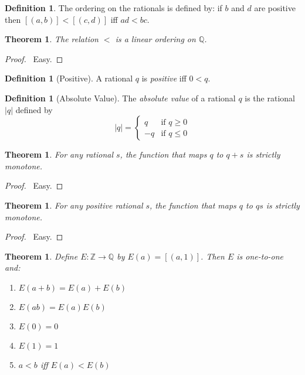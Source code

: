 \documentclass{article}
\let\qed\relax
\newtheorem{theorem}[axiom]{Theorem}
\theoremstyle{definition}
\newtheorem{definition}[axiom]{Definition}
\begin{document}
    \begin{definition}
        The ordering on the rationals is defined by: if $b$ and $d$ are positive then
        $[(a,b)] < [(c,d)]$ iff $ad < bc$.
    \end{definition}

    \begin{theorem}
        The relation $<$ is a linear ordering on $\mathbb{Q}$.
    \end{theorem}

    \begin{proof}
        \pf\ Easy. \qed
    \end{proof}

    \begin{definition}[Positive]
        A rational $q$ is \emph{positive} iff $0 < q$.
    \end{definition}

    \begin{definition}[Absolute Value]
        The \emph{absolute value} of a rational $q$ is the rational $|q|$ defined by
        \[ |q| = \begin{cases}
            q & \text{if } q \geq 0 \\
            -q & \text{if } q \leq 0
        \end{cases} \]
    \end{definition}

    \begin{theorem}
        For any rational $s$, the function that maps $q$ to $q + s$ is strictly monotone.
    \end{theorem}
    
    \begin{proof}
        \pf\ Easy. \qed
    \end{proof}

    \begin{theorem}
        For any positive rational $s$, the function that maps $q$ to $qs$ is strictly monotone.
    \end{theorem}

    \begin{proof}
        \pf\ Easy. \qed
    \end{proof}

    \begin{theorem}
        Define $E : \mathbb{Z} \rightarrow \mathbb{Q}$ by $E(a) = [(a,1)]$. Then $E$ is one-to-one and:
        \begin{enumerate}
            \item $E(a+b) = E(a) + E(b)$
            \item $E(ab) = E(a)E(b)$
            \item $E(0) = 0$
            \item $E(1) = 1$
            \item $a < b$ iff $E(a) < E(b)$
        \end{enumerate}
    \end{theorem}
\end{document}
